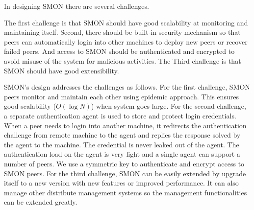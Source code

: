 


In designing SMON there are several challenges.

The first challenge is that SMON should have good
scalability at monitoring and maintaining itself.  Second,
there should be built-in security mechanism so that peers
can automatically login into other machines to deploy new
peers or recover failed peers. And access to SMON should be
authenticated and encrypted to avoid misuse of the system
for malicious activities.  The Third challenge is that SMON
should have good extensibility.

SMON's design addresses the challenges as follows. For the
first challenge, SMON peers monitor and maintain each other
using epidemic approach. This ensures good scalability
($O(\log N)$) when system goes large. For the second
challenge, a separate authentication agent is used to store
and protect login credentials. When a peer needs to login
into another machine, it redirects the authentication
challenge from remote machine to the agent and replies the
response solved by the agent to the machine.  The credential
is never leaked out of the agent. The authentication load on
the agent is very light and a single agent can support a
number of peers. We use a symmetric key to
authenticate and encrypt access to SMON peers.
For the third challenge, SMON can be easily extended by
upgrade itself to a new version with new features or
improved performance. It can also manage other distribute
management systems so the management functionalities can be
extended greatly.


